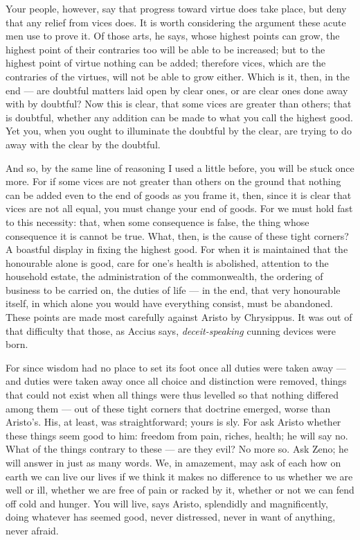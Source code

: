  Your people, however, say that progress toward virtue does take place, but deny that any relief from vices does. It is worth considering the argument these acute men use to prove it. Of those arts, he says, whose highest points can grow, the highest point of their contraries too will be able to be increased; but to the highest point of virtue nothing can be added; therefore vices, which are the contraries of the virtues, will not be able to grow either. Which is it, then, in the end — are doubtful matters laid open by clear ones, or are clear ones done away with by doubtful? Now this is clear, that some vices are greater than others; that is doubtful, whether any addition can be made to what you call the highest good. Yet you, when you ought to illuminate the doubtful by the clear, are trying to do away with the clear by the doubtful.

 And so, by the same line of reasoning I used a little before, you will be stuck once more. For if some vices are not greater than others on the ground that nothing can be added even to the end of goods as you frame it, then, since it is clear that vices are not all equal, you must change your end of goods. For we must hold fast to this necessity: that, when some consequence is false, the thing whose consequence it is cannot be true. What, then, is the cause of these tight corners? A boastful display in fixing the highest good. For when it is maintained that the honourable alone is good, care for one's health is abolished, attention to the household estate, the administration of the commonwealth, the ordering of business to be carried on, the duties of life — in the end, that very honourable itself, in which alone you would have everything consist, must be abandoned. These points are made most carefully against Aristo by Chrysippus. It was out of that difficulty that those, as Accius says, \textit{deceit-speaking} cunning devices were born.

 For since wisdom had no place to set its foot once all duties were taken away — and duties were taken away once all choice and distinction were removed, things that could not exist when all things were thus levelled so that nothing differed among them — out of these tight corners that doctrine emerged, worse than Aristo's. His, at least, was straightforward; yours is sly. For ask Aristo whether these things seem good to him: freedom from pain, riches, health; he will say no. What of the things contrary to these — are they evil? No more so. Ask Zeno; he will answer in just as many words. We, in amazement, may ask of each how on earth we can live our lives if we think it makes no difference to us whether we are well or ill, whether we are free of pain or racked by it, whether or not we can fend off cold and hunger. You will live, says Aristo, splendidly and magnificently, doing whatever has seemed good, never distressed, never in want of anything, never afraid.

